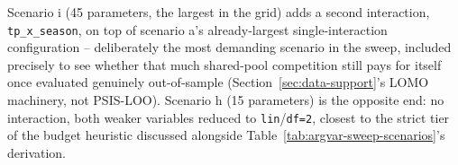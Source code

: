 \documentclass[12pt,a4paper]{article}
\begin{document}
Scenario i (45 parameters, the largest in the grid) adds a second interaction, \texttt{tp\_x\_season}, on top of scenario a's already-largest single-interaction configuration -- deliberately the most demanding scenario in the sweep, included precisely to see whether that much shared-pool competition still pays for itself once evaluated genuinely out-of-sample (Section~\ref{sec:data-support}'s LOMO machinery, not PSIS-LOO). Scenario h (15 parameters) is the opposite end: no interaction, both weaker variables reduced to \texttt{lin}/\texttt{df=2}, closest to the strict tier of the budget heuristic discussed alongside Table~\ref{tab:argvar-sweep-scenarios}'s derivation.
\end{document}
